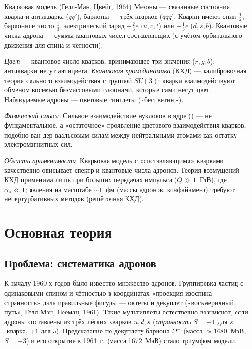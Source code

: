\begin{principle}{Кварковая модель (Гелл-Ман, Цвейг, 1964)}
Мезоны — связанные состояния кварка и антикварка ($q\bar q'$), барионы — трёх кварков ($qqq$).
Кварки имеют спин $\frac12$, барионное число $\frac13$, электрический заряд $+\frac23e$ ($u,c,t$) или $-\frac13e$ ($d,s,b$).
Квантовые числа адрона — суммы квантовых чисел составляющих (с учётом орбитального движения для спина и чётности).
\end{principle}

\begin{definition}
\emph{Цвет} — квантовое число кварков, принимающее три значения ($r,g,b$); антикварки несут антицвета.
\emph{Квантовая хромодинамика} (КХД) — калибровочная теория сильного взаимодействия с группой $SU(3)$:
кварки взаимодействуют обменом восемью безмассовыми глюонами, которые сами несут цвет.
Наблюдаемые адроны — цветовые синглеты («бесцветны»).
\end{definition}

\emph{Физический смысл.} Сильное взаимодействие нуклонов в ядре () — не фундаментальное, а
«остаточное» проявление цветового взаимодействия кварков, подобно ван-дер-ваальсовым силам между
нейтральными атомами как остатку электромагнитных сил.

\emph{Область применимости.} Кварковая модель с «составляющими» кварками качественно описывает спектр и
квантовые числа адронов. Теория возмущений КХД применима лишь при больших передачах импульса
($Q\gg1$~ГэВ), где $\alpha_s\ll1$; явления на масштабе $\sim1$~фм (массы адронов, конфайнмент) требуют
непертурбативных методов (решёточная КХД).

\section{Основная теория}

\subsection{Проблема: систематика адронов}

К началу 1960-х годов было известно множество адронов. Группировка частиц с одинаковыми спином и чётностью
в координатах «проекция изоспина -- странность» дала правильные фигуры — октеты и декуплет («восьмеричный
путь», Гелл-Ман, Нееман, 1961). Такие мультиплеты естественно возникают, если адроны составлены из трёх
лёгких кварков $u,d,s$ (\emph{странность} $S=-1$ для $s$-кварка, $+1$ для $\bar s$). Предсказание по декуплету
бариона $\Omega^-$ (масса $\approx1680$~МэВ, $S=-3$) и его открытие в 1964~г. (масса 1672~МэВ) стало триумфом
модели.

